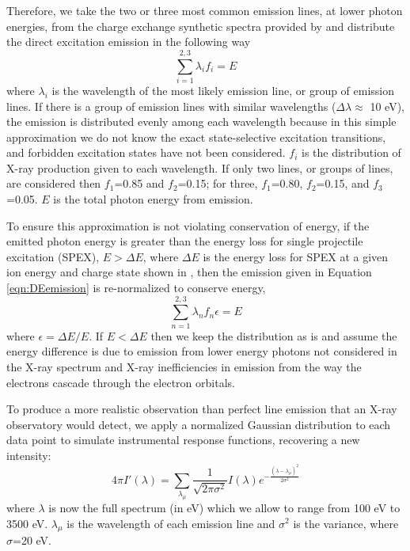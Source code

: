 \documentclass[draft]{agujournal2018}
\begin{document}
Therefore, we take the two or three most common emission lines, at lower photon energies, from the charge exchange synthetic spectra provided by \citet{hui2010} and distribute the direct excitation emission in the following way
\begin{equation}
    \sum_{i=1}^{2,3}\lambda_{i}f_{i}=E
    \label{eqn:DEemission}
\end{equation}
where $\lambda_{i}$ is the wavelength of the most likely emission line, or group of emission lines.
If there is a group of emission lines with similar wavelengths ($\Delta\lambda\approx$ 10 eV), the emission is distributed evenly among each wavelength because in this simple approximation we do not know the exact state-selective excitation transitions, and forbidden excitation states have not been considered.
$f_{i}$ is the distribution of X-ray production given to each wavelength.
If only two lines, or groups of lines, are considered then $f_{1}$=0.85 and $f_{2}$=0.15; for three, $f_{1}$=0.80, $f_{2}$=0.15, and $f_{3}$=0.05.
$E$ is the total photon energy from emission.

To ensure this approximation is not violating conservation of energy, if the emitted photon energy is greater than the energy loss for single projectile excitation (SPEX), $E>\Delta E$, where $\Delta E$ is the energy loss for SPEX at a given ion energy and charge state shown in \citet{schultz2019}, then the emission given in Equation \ref{eqn:DEemission} is re-normalized to conserve energy,
\begin{equation}
    \sum_{n=1}^{2,3}\lambda_{n}f_{n}\epsilon=E
\end{equation}
where $\epsilon=\Delta E/E$.
If $E<\Delta E$ then we keep the distribution as is and assume the energy difference is due to emission from lower energy photons not considered in the X-ray spectrum and X-ray inefficiencies in emission from the way the electrons cascade through the electron orbitals.

To produce a more realistic observation than perfect line emission that an X-ray observatory would detect, we apply a normalized Gaussian distribution to each data point to simulate instrumental response functions, recovering a new intensity:
\begin{equation}
    4\pi I'(\lambda)=\sum_{\lambda_{\mu}}\frac{1}{\sqrt{2\pi\sigma^2}}I(\lambda)e^{-\frac{(\lambda-\lambda_{\mu})^2}{2\sigma^2}}
\end{equation}
where $\lambda$ is now the full spectrum (in eV) which we allow to range from 100 eV to 3500 eV. $\lambda_{\mu}$ is the wavelength of each emission line and $\sigma^2$ is the variance, where $\sigma$=20 eV.
\end{document}
